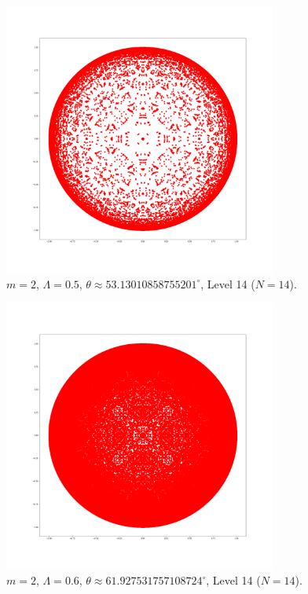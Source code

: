 \documentclass[12pt,oneside]{sfsuthesis}
\theoremstyle{plain} %
\theoremstyle{definition}  %
\theoremstyle{remark}  %
\theoremstyle{plain}
\begin{document}
{\begin{figure}[H]
\centering
\includegraphics[width=0.8\textwidth]{Lambda=0.5,m=2,N=14.png}
\caption{$m=2$, $\Lambda=0.5$, $\theta\approx 53.13010858755201^\circ$, Level 14 ($N=14$).}
\end{figure}

\begin{figure}[H]
\centering
\includegraphics[width=0.8\textwidth]{Lambda=0.6,m=2,N=14.png}
\caption{$m=2$, $\Lambda=0.6$, $\theta\approx 61.927531757108724^\circ$, Level 14 ($N=14$).}
\end{figure}


}
\end{document}

